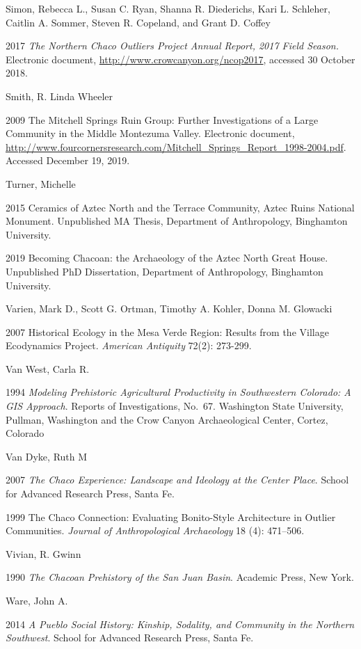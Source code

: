 \documentclass[
  12pt,
]{krantz}
\begin{document}
Simon, Rebecca L., Susan C. Ryan, Shanna R. Diederichs, Kari L.
Schleher, Caitlin A. Sommer, Steven R. Copeland, and Grant D. Coffey

2017 \emph{The Northern Chaco Outliers Project Annual Report, 2017 Field
Season.} Electronic document, \url{http://www.crowcanyon.org/ncop2017},
accessed 30 October 2018.

Smith, R. Linda Wheeler

2009 The Mitchell Springs Ruin Group: Further Investigations of a Large
Community in the Middle Montezuma Valley. Electronic document,
\url{http://www.fourcornersresearch.com/Mitchell_Springs_Report_1998-2004.pdf}.
Accessed December 19, 2019.

Turner, Michelle

2015 Ceramics of Aztec North and the Terrace Community, Aztec Ruins
National Monument. Unpublished MA Thesis, Department of Anthropology,
Binghamton University.

2019 Becoming Chacoan: the Archaeology of the Aztec North Great House.
Unpublished PhD Dissertation, Department of Anthropology, Binghamton
University.

Varien, Mark D., Scott G. Ortman, Timothy A. Kohler, Donna M. Glowacki

2007 Historical Ecology in the Mesa Verde Region: Results from the
Village Ecodynamics Project. \emph{American Antiquity} 72(2): 273-299.

Van West, Carla R.

1994 \emph{Modeling Prehistoric Agricultural Productivity in Southwestern
Colorado: A GIS Approach}. Reports of Investigations, No.~67. Washington
State University, Pullman, Washington and the Crow Canyon Archaeological
Center, Cortez, Colorado

Van Dyke, Ruth M

2007 \emph{The Chaco Experience: Landscape and Ideology at the Center Place}.
School for Advanced Research Press, Santa Fe.

1999 The Chaco Connection: Evaluating Bonito-Style Architecture in
Outlier Communities. \emph{Journal of Anthropological Archaeology} 18 (4):
471--506.

Vivian, R. Gwinn

1990 \emph{The Chacoan Prehistory of the San Juan Basin}. Academic Press, New
York.

Ware, John A.

2014 \emph{A Pueblo Social History: Kinship, Sodality, and Community in the
Northern Southwest}. School for Advanced Research Press, Santa Fe.
\end{document}
